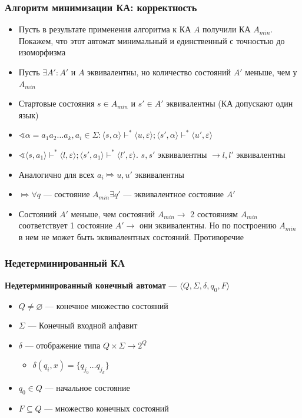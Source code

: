 \documentclass{beamer}
\begin{document}
\begin{frame}[fragile]
  \transwipe[direction=90]
  \frametitle{Алгоритм минимизации КА: корректность}
    \begin{itemize}
      \item Пусть в результате применения алгоритма к КА $A$ получили КА $A_{min}$. Покажем, что этот автомат минимальный и единственный с точностью до изоморфизма
      \item Пусть $\exists A' : A'$ и $A$ эквивалентны, но количество состояний $A'$ меньше, чем у $A_{min}$
      \item Стартовые состояния $s \in A_{min}$ и $s' \in A'$ эквивалентны (КА допускают один язык)
      \item $\sphericalangle \alpha = a_1 a_2 \dots a_k, a_i \in \Sigma: \langle s, \alpha \rangle \vdash^* \langle u, \varepsilon \rangle; \langle s', \alpha \rangle \vdash^* \langle u', \varepsilon \rangle$
      \item $\sphericalangle \langle s, a_1 \rangle \vdash^* \langle l, \varepsilon \rangle; \langle s', a_1 \rangle \vdash^* \langle l', \varepsilon \rangle$. $s, s'$ эквивалентны $\to l, l'$ эквивалентны
      \item Аналогично для всех $a_i \Mapsto u, u'$ эквивалентны
      \item $\Mapsto \forall q$ --- состояние $A_{min} \exists q'$ --- эквивалентное состояние $A'$
      \item Состояний $A'$ меньше, чем состояний $A_{min} \to$ 2 состояниям $A_{min}$ соответствует 1 состояние $A' \to$ они эквивалентны. Но по построению $A_{min}$ в нем не может быть эквивалентных состояний. Противоречие
    \end{itemize}

\end{frame}

\begin{frame}[fragile]
  \transwipe[direction=90]
  \frametitle{Недетерминированный КА}
 \textbf{Недетерминированный конечный автомат} --- $\langle Q, \Sigma, \delta, q_0, F \rangle$
  \begin{itemize}
    \item $Q \neq \varnothing$ --- конечное множество состояний
    \item $\Sigma$ --- Конечный входной алфавит
    \item $\delta$ --- отображение типа $Q \times \Sigma \to 2^Q$
    \begin{itemize}
      \item $\delta(q_i, x) = \{ q_{j_0} \dots q_{j_k} \}$
    \end{itemize}
    \item $q_0 \in Q$ --- начальное состояние
    \item $F \subseteq Q$ --- множество конечных состояний
  \end{itemize}

\end{frame}
\end{document}
